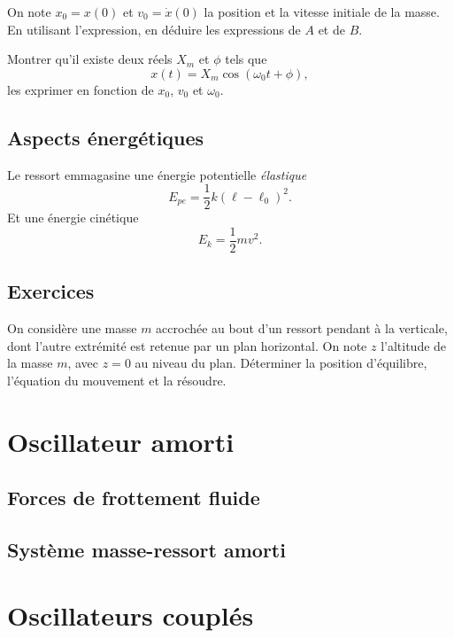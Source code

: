 \documentclass[../main]{subfiles}
\begin{document}
On note $x_0=x(0)$ et $v_0=\dot{x}(0)$ la position et la vitesse initiale de la masse. En utilisant l'expression, en déduire les expressions de $A$ et de $B$.


\begin{exo}
Montrer qu'il existe deux réels $X_m$ et $\phi$ tels que 
\[x(t)=X_m\cos(\omega_0t+\phi),\]
les exprimer en fonction de $x_0$, $v_0$ et $\omega_0$.
\end{exo}

\subsection{Aspects énergétiques}

Le ressort emmagasine une énergie potentielle \textit{élastique}
\[
E_{pe} = \frac{1}{2}k{(\ell-\ell_0)}^2.
\]
Et une énergie cinétique
\[
E_k = \frac{1}{2}mv^2.
\]



\subsection{Exercices}

\begin{exo}
	On considère une masse $m$ accrochée au bout d'un ressort pendant à la verticale, dont l'autre extrémité est retenue par un plan horizontal. On note $z$ l'altitude de la masse $m$, avec $z=0$ au niveau du plan. Déterminer la position d'équilibre, l'équation du mouvement et la résoudre.
\end{exo}

\section{Oscillateur amorti}

\subsection{Forces de frottement fluide}

\subsection{Système masse-ressort amorti}

\section{Oscillateurs couplés}
\end{document}
